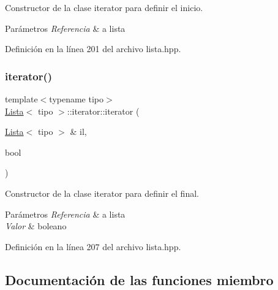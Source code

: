 Constructor de la clase iterator para definir el inicio. 


\begin{DoxyParams}{Parámetros}
{\em Referencia} & a lista \\
\hline
\end{DoxyParams}


Definición en la línea 201 del archivo lista.\+hpp.

\mbox{\label{classLista_1_1iterator_ad96ff61e26fb131406d0b320b36e9516}} 
\subsubsection{\texorpdfstring{iterator()}{iterator()}\hspace{0.1cm}{\footnotesize\ttfamily [2/2]}}
{\footnotesize\ttfamily template$<$typename tipo$>$ \\
\hyperlink{classLista}{Lista}$<$ tipo $>$\+::iterator\+::iterator (\begin{DoxyParamCaption}\item[{\hyperlink{classLista}{Lista}$<$ tipo $>$ \&}]{il,  }\item[{bool}]{ }\end{DoxyParamCaption})\hspace{0.3cm}{\ttfamily [inline]}}



Constructor de la clase iterator para definir el final. 


\begin{DoxyParams}{Parámetros}
{\em Referencia} & a lista \\
\hline
{\em Valor} & boleano \\
\hline
\end{DoxyParams}


Definición en la línea 207 del archivo lista.\+hpp.



\subsection{Documentación de las funciones miembro}
\mbox{\label{classLista_1_1iterator_a6e73de7c83716c9bd99bd68b89214d81}} 
